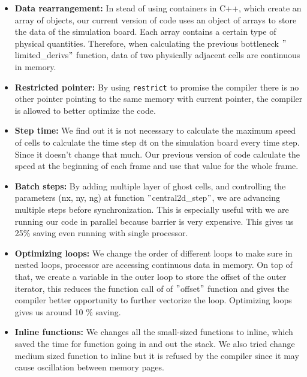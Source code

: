 \documentclass[11pt]{article}
\begin{document}
        \begin{itemize}
			\item \textbf{Data rearrangement:} In stead of using containers in C++, which create
            an array of objects, our current version of code uses an object of arrays to store the data
            of the simulation board. Each array contains a certain type of physical quantities.
            Therefore, when calculating the previous bottleneck $"$limited\_derivs$"$ function,
            data of two physically adjacent cells are continuous in memory.
            \item \textbf{Restricted pointer:} By using \texttt{restrict} to promise the compiler
            there is no other pointer pointing to the same memory with current pointer, the compiler
            is allowed to better optimize the code.
            \item \textbf{Step time:} We find out it is not necessary to calculate the maximum speed
            of cells to calculate the time step dt on the simulation board every time step. Since it
            doesn't change that much. Our previous version of code calculate the speed at the beginning
            of each frame and use that value for the whole frame.
            \item \textbf{Batch steps:} By adding multiple layer of ghost cells, and controlling the
            parameters (nx, ny, ng) at function $"$central2d\_step$"$, we are advancing multiple steps
            before synchronization. This is especially useful with we are running our code in parallel
            because barrier is very expensive. This gives us 25\% saving even running with single processor.
            \item \textbf{Optimizing loops:} We change the order of different loops to make sure in nested
            loops, processor are accessing continuous data in memory. On top of that, we create a variable
            in the outer loop to store the offset of the outer iterator, this reduces the function call of
            of $"$offset$"$ function and gives the compiler better opportunity to further vectorize the loop.
            Optimizing loops gives us around 10 \% saving.
            \clearpage
            \item \textbf{Inline functions:} We changes all the small-sized functions to inline, which saved
            the time for function going in and out the stack. We also tried change medium sized function to inline
            but it is refused by the compiler since it may cause oscillation between memory pages. 
		\end{itemize}
        
\end{document}
